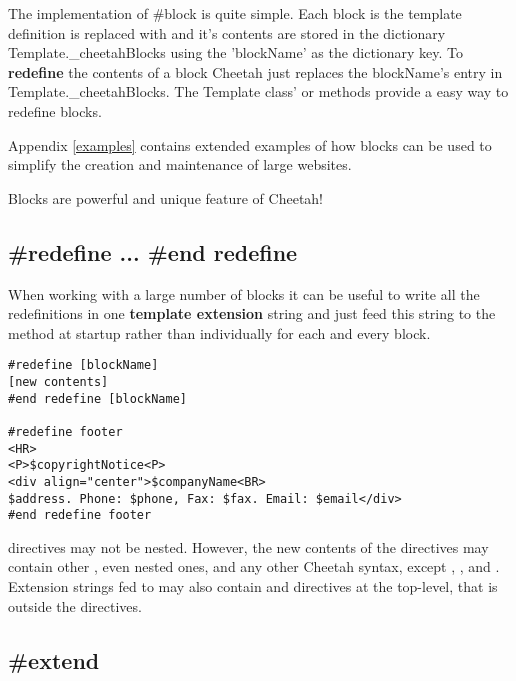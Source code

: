 The implementation of \#block is quite simple.  Each block is the template
definition is replaced with  and it's
contents are stored in the dictionary Template._cheetahBlocks using the
'blockName' as the dictionary key.  To {\bf redefine} the contents of a block
Cheetah just replaces the blockName's entry in Template._cheetahBlocks.  The
Template class'  or
 methods provide a easy way to redefine blocks.

Appendix \ref{examples} contains extended examples of how blocks can be used to
simplify the creation and maintenance of large websites.

Blocks are powerful and unique feature of Cheetah!

\subsection{\#redefine ... \#end redefine}
\label{directives.redefine}

When working with a large number of blocks it can be useful to write all the
redefinitions in one {\bf template extension} string and just feed this string
to the  method at startup rather
than individually  for each and every block.

\begin{verbatim}
#redefine [blockName]
[new contents]
#end redefine [blockName]

#redefine footer
<HR>
<P>$copyrightNotice<P>
<div align="center">$companyName<BR>
$address. Phone: $phone, Fax: $fax. Email: $email</div>
#end redefine footer
\end{verbatim}

 directives may not be nested.  However, the new contents of
the  directives may contain other , even nested
ones, and any other Cheetah syntax, except , , and
. Extension strings fed to
 may also contain  and
 directives at the top-level, that is outside the
 directives.

\subsection{\#extend}
\label{directives.extend}

